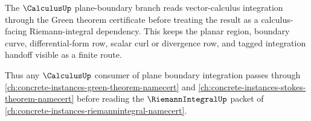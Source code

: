 The $\CalculusUp$ plane-boundary branch reads vector-calculus integration through the Green theorem certificate before treating the result as a calculus-facing Riemann-integral dependency. This keeps the planar region, boundary curve, differential-form row, scalar curl or divergence row, and tagged integration handoff visible as a finite route.

Thus any $\CalculusUp$ consumer of plane boundary integration passes through \autoref{ch:concrete-instances-green-theorem-namecert} and \autoref{ch:concrete-instances-stokes-theorem-namecert} before reading the $\RiemannIntegralUp$ packet of \autoref{ch:concrete-instances-riemannintegral-namecert}.
